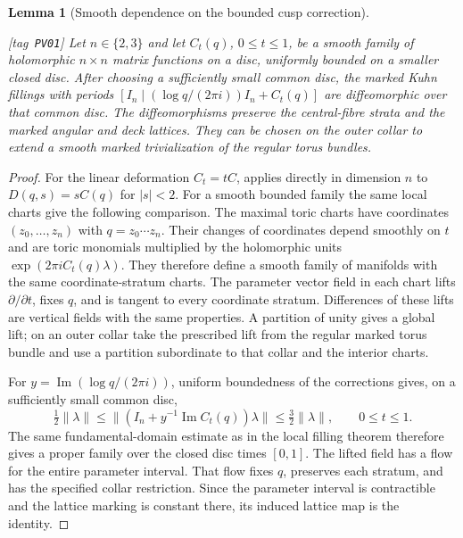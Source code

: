 \documentclass[11pt,a4paper]{article}
\numberwithin{equation}{section}
\newtheorem{lemma}[lemma]{Lemma}
\theoremstyle{definition}
\newcommand{\StatementRecord}[4]{{\upshape\footnotesize[tag~\texttt{#3}]}\enspace\ignorespaces}
\begin{document}
\begin{lemma}[Smooth dependence on the bounded cusp correction]
\hypertarget{tag-PV01}{}\label{pub:V:cusp-smooth-dependence}
\StatementRecord{pub:V:cusp-smooth-dependence}{proved}{PV01}{}
Let $n\in\{2,3\}$ and let $C_t(q)$, $0\leq t\leq1$, be a
smooth family of holomorphic $n\times n$ matrix functions on a disc,
uniformly bounded on a smaller closed disc. After choosing a sufficiently
small common disc, the marked Kuhn fillings with periods
$[I_n\mid (\log q/(2\pi i))I_n+C_t(q)]$ are diffeomorphic over
that common disc. The diffeomorphisms preserve the central-fibre
strata and the marked angular and deck lattices. They can be chosen
on the outer collar to extend a smooth marked trivialization of the
regular torus bundles.
\end{lemma}
\begin{proof}
For the linear deformation $C_t=tC$,
\cite[Theorem~8.7, arXiv v1, pp.~57--58]{Yang2026} applies directly
in dimension $n$ to $D(q,s)=sC(q)$ for $|s|<2$.
For a smooth bounded family the same local charts give the following
comparison. The maximal toric charts have coordinates
$(z_0,\ldots,z_n)$ with $q=z_0\cdots z_n$. Their changes of
coordinates depend smoothly on $t$ and are toric monomials multiplied
by the holomorphic units $\exp(2\pi iC_t(q)\lambda)$.
They therefore define a smooth family of manifolds with the same
coordinate-stratum charts. The parameter vector field in each chart
lifts $\partial/\partial t$, fixes $q$, and is tangent to every
coordinate stratum. Differences of these lifts are vertical fields
with the same properties. A partition of unity gives a global lift;
on an outer collar take the prescribed lift from the regular marked
torus bundle and use a partition subordinate to that collar and the
interior charts.

For $y=\operatorname{Im}(\log q/(2\pi i))$, uniform boundedness
of the corrections gives, on a sufficiently small common disc,
\[
 \tfrac12\|\lambda\|\leq
 \|(I_n+y^{-1}\operatorname{Im}C_t(q))\lambda\|
 \leq\tfrac32\|\lambda\|,
 \qquad 0\leq t\leq1.
\]
The same fundamental-domain estimate as in the local filling theorem
therefore gives a proper family over the closed disc times $[0,1]$.
The lifted field has a flow for the entire parameter interval.
That flow fixes $q$, preserves each stratum, and has the specified
collar restriction. Since the parameter interval is contractible
and the lattice marking is constant there, its induced lattice map
is the identity.
\end{proof}
\end{document}
